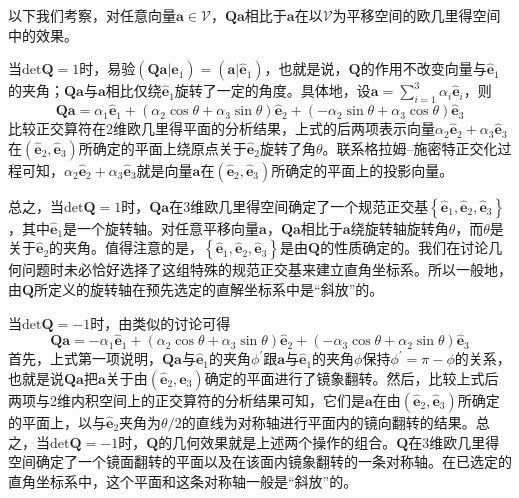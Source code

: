 \documentclass[main.tex]{subfiles}
\begin{document}
以下我们考察，对任意向量$\mathbf{a}\in\mathcal{V}$，$\mathbf{Qa}$相比于$\mathbf{a}$在以$\mathcal{V}$为平移空间的欧几里得空间中的效果。

当$\mathrm{det}\mathbf{Q}=1$时，易验$\left(\mathbf{Qa}|\mathbf{\hat{e}}_1\right)=\left(\mathbf{a}|\mathbf{\hat{e}}_1\right)$，也就是说，$\mathbf{Q}$的作用不改变向量与$\mathbf{\hat{e}}_1$的夹角；$\mathbf{Qa}$与$\mathbf{a}$相比仅绕$\mathbf{\hat{e}}_1$旋转了一定的角度。具体地，设$\mathbf{a}=\sum_{i=1}^3\alpha_i\mathbf{\hat{e}}_i$，则
\[\mathbf{Qa}=\alpha_1\mathbf{\hat{e}}_1+\left(\alpha_2\cos\theta+\alpha_3\sin\theta\right)\mathbf{\hat{e}}_2+\left(-\alpha_2\sin\theta+\alpha_3\cos\theta\right)\mathbf{\hat{e}}_3\]
比较正交算符在2维欧几里得平面的分析结果，上式的后两项表示向量$\alpha_2\mathbf{\hat{e}}_2+\alpha_3\mathbf{\hat{e}}_3$在$\left(\mathbf{\hat{e}}_2,\mathbf{\hat{e}}_3\right)$所确定的平面上绕原点关于$\mathbf{\hat{e}}_2$旋转了角$\theta$。联系格拉姆--施密特正交化过程可知，$\alpha_2\mathbf{\hat{e}}_2+\alpha_3\mathbf{\hat{e}}_3$就是向量$\mathbf{a}$在$\left(\mathbf{\hat{e}}_2,\mathbf{\hat{e}}_3\right)$所确定的平面上的投影向量。

总之，当$\mathrm{det}\mathbf{Q}=1$时，$\mathbf{Qa}$在3维欧几里得空间确定了一个规范正交基$\left\{\mathbf{\hat{e}}_1,\mathbf{\hat{e}}_2,\mathbf{\hat{e}}_3\right\}$，其中$\mathbf{\hat{e}}_1$是一个旋转轴。对任意平移向量$\mathbf{a}$，$\mathbf{Qa}$相比于$\mathbf{a}$绕旋转轴旋转角$\theta$，而$\theta$是关于$\mathbf{\hat{e}}_2$的夹角。值得注意的是，$\left\{\mathbf{\hat{e}}_1,\mathbf{\hat{e}}_2,\mathbf{\hat{e}}_3\right\}$是由$\mathbf{Q}$的性质确定的。我们在讨论几何问题时未必恰好选择了这组特殊的规范正交基来建立直角坐标系。所以一般地，由$\mathbf{Q}$所定义的旋转轴在预先选定的直解坐标系中是“斜放”的。

当$\mathrm{det}\mathbf{Q}=-1$时，由类似的讨论可得
\[\mathbf{Qa}=-\alpha_1\mathbf{\hat{e}}_1+\left(\alpha_2\cos\theta+\alpha_3\sin\theta\right)\mathbf{\hat{e}}_2+\left(-\alpha_3\cos\theta+\alpha_2\sin\theta\right)\mathbf{\hat{e}}_3\]
首先，上式第一项说明，$\mathbf{Qa}$与$\mathbf{\hat{e}}_1$的夹角$\phi^\prime$跟$\mathbf{a}$与$\mathbf{\hat{e}}_1$的夹角$\phi$保持$\phi^\prime=\pi-\phi$的关系，也就是说$\mathbf{Qa}$把$\mathbf{a}$关于由$\left(\mathbf{\hat{e}}_2,\mathbf{\hat{e}}_3\right)$确定的平面进行了镜象翻转。然后，比较上式后两项与2维内积空间上的正交算符的分析结果可知，它们是$\mathbf{a}$在由$\left(\mathbf{\hat{e}}_2,\mathbf{\hat{e}}_3\right)$所确定的平面上，以与$\mathbf{\hat{e}}_2$夹角为$\theta/2$的直线为对称轴进行平面内的镜向翻转的结果。总之，当$\mathrm{det}\mathbf{Q}=-1$时，$\mathbf{Q}$的几何效果就是上述两个操作的组合。$\mathbf{Q}$在3维欧几里得空间确定了一个镜面翻转的平面以及在该面内镜象翻转的一条对称轴。在已选定的直角坐标系中，这个平面和这条对称轴一般是“斜放”的。
\end{document}
